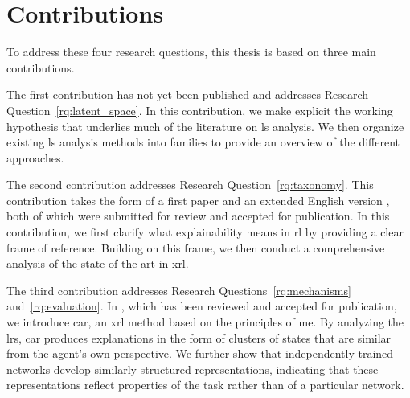 \section{Contributions}
\label{sec:introduction_contributions}

To address these four research questions, this thesis is based on three main contributions.

The first contribution has not yet been published and addresses Research Question~\ref{rq:latent_space}.
In this contribution, we make explicit the working hypothesis that underlies much of the literature on \gls{ls} analysis.
We then organize existing \gls{ls} analysis methods into families to provide an overview of the different approaches.

The second contribution addresses Research Question~\ref{rq:taxonomy}.
This contribution takes the form of a first paper \parencite{alaarabiou:hal-04685607} and an extended English version \parencite{alaarabiou2026taxonomy}, both of which were submitted for review and accepted for publication.
In this contribution, we first clarify what explainability means in \gls{rl} by providing a clear frame of reference.
Building on this frame, we then conduct a comprehensive analysis of the state of the art in \gls{xrl}.

The third contribution addresses Research Questions~\ref{rq:mechanisms} and~\ref{rq:evaluation}.
In \textcite{alaarabiou2026car}, which has been reviewed and accepted for publication, we introduce \gls{car}, an \gls{xrl} method based on the principles of \gls{me}.
By analyzing the \glspl{lr}, \gls{car} produces explanations in the form of clusters of states that are similar from the agent's own perspective.
We further show that independently trained networks develop similarly structured representations, indicating that these representations reflect properties of the task rather than of a particular network.
